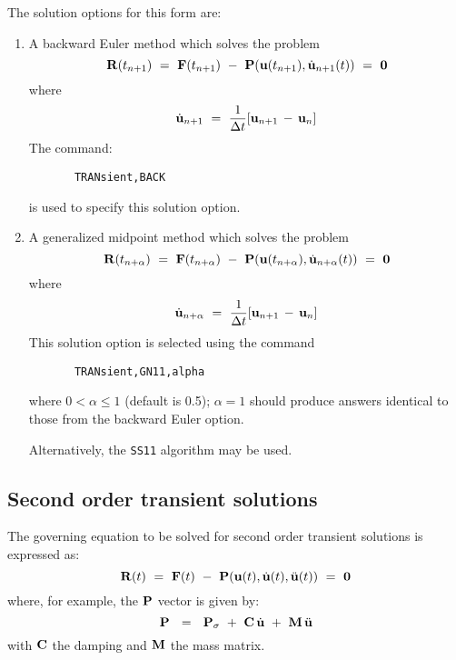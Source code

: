 The solution options for this form are:

\begin{enumerate}
\item
{A backward Euler method which solves the problem
\begin{equation}
\mathbf{R} (t_{n+1})
~=~ \mathbf{F}(t_{n+1}) ~-~ \mathbf{P}( \mathbf{u}(t_{n+1}) , \dot{\mathbf{u}}_{n+1} (t) )
~=~ {\bf 0}
\end{equation}
where
\begin{equation}
\dot{\mathbf{u}}_{n+1} ~=~ \frac{1}{\Delta t} [ \mathbf{u}_{n+1} \,-\, \mathbf{u}_n ]
\end{equation}
The command:
\begin{verbatim}
       TRANsient,BACK
\end{verbatim}
is used to specify this solution option.}

\item
{A generalized midpoint method which solves the problem
\begin{equation}
\mathbf{R} (t_{n+\alpha}) ~=~ \mathbf{F}(t_{n+\alpha})
~-~ \mathbf{P}( \mathbf{u}(t_{n+\alpha}) , \dot{\mathbf{u}}_{n+\alpha} (t) ) ~=~ {\bf 0}
\end{equation}
where
\begin{equation}
\dot{\mathbf{u}}_{n+\alpha} ~=~ \frac{1}{\Delta t} [ \mathbf{u}_{n+1} \,-\, \mathbf{u}_n ]
\end{equation}
This solution option is selected using the command
\begin{verbatim}
       TRANsient,GN11,alpha
\end{verbatim}
where $0 < \alpha \le 1$ (default is 0.5); $\alpha = 1$ should produce answers
identical to those from the backward Euler option.}
Alternatively, the \texttt{SS11} algorithm may be used.
\end{enumerate}

\subsection{Second order transient solutions}
\label{trans2}

The governing equation to be solved for second order transient solutions
is expressed as:
\begin{equation}
\mathbf{R} (t) ~=~
\mathbf{F}(t) ~-~ \mathbf{P}( \mathbf{u}(t) , \dot{\mathbf{u}} (t) , \ddot{\mathbf{u}}(t) )
~=~ {\bf 0}
\end{equation}
where, for example, the $\mathbf{P}$ vector is given by:
\begin{equation}
\mathbf{P}~~=~~ \mathbf{P}_{\sigma} ~+~ \mathbf{C} \, \dot{\mathbf{u}} ~+~ \mathbf{M} \, \ddot{\mathbf{u}}
\end{equation}
with $\mathbf{C}$ the damping and $\mathbf{M}$ the mass matrix.

